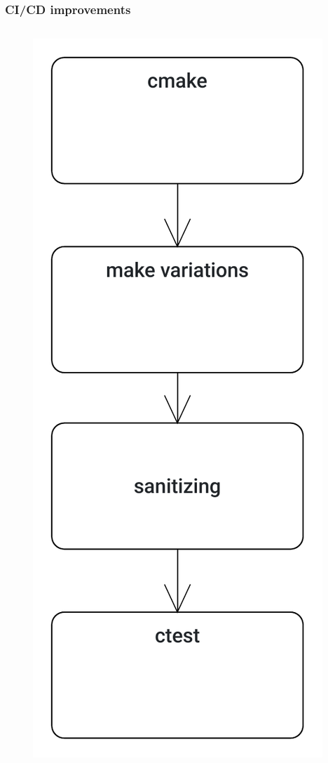 \begin{frame}
	\frametitle{CI/CD improvements}
	\begin{columns}
		\begin{column}{0.3\textwidth}
			\begin{figure}
				\centering
				\includegraphics[width=0.55\linewidth]{cicd_old}
				\label{fig:cicdold}
			\end{figure}
			
		\end{column}
	

\end{columns}
\end{frame}
